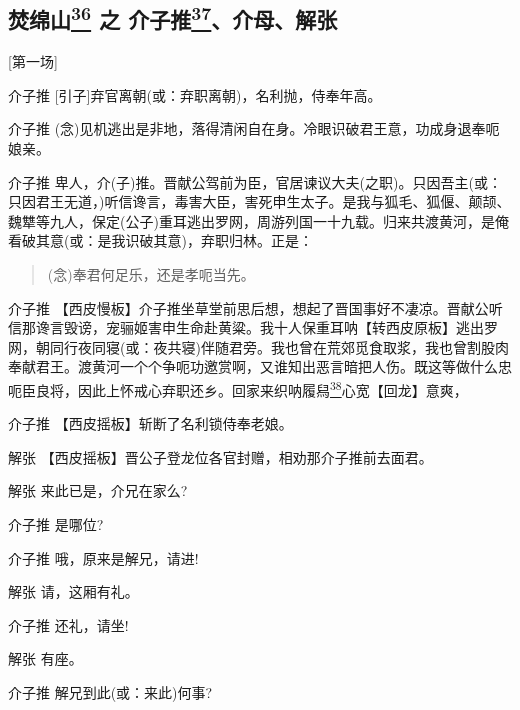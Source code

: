 \setcounter{page}{1}

%
%
%
%
%
\newpage
\hypertarget{ux711aux7ef5ux5c71-ux4e4b-ux4ecbux5b50ux63a8ux4ecbux6bcdux89e3ux5f20}{%
\subsection{\texorpdfstring{焚绵山\protect\hyperlink{fn36}{\textsuperscript{36}}
之
介子推\protect\hyperlink{fn37}{\textsuperscript{37}}、介母、解张}{焚绵山36 之 介子推37、介母、解张}}\label{ux711aux7ef5ux5c71-ux4e4b-ux4ecbux5b50ux63a8ux4ecbux6bcdux89e3ux5f20}}

{[}第一场{]}

介子推 {[}引子{]}弃官离朝(或：弃职离朝)，名利抛，侍奉年高。

介子推
(念)见机逃出是非地，落得清闲自在身。冷眼识破君王意，功成身退奉呃娘亲。

介子推
卑人，介(子)推。晋献公驾前为臣，官居谏议大夫(之职)。只因吾主(或：只因君王无道，)听信谗言，毒害大臣，害死申生太子。是我与狐毛、狐偃、颠颉、魏犨等九人，保定(公子)重耳逃出罗网，周游列国一十九载。归来共渡黄河，是俺看破其意(或：是我识破其意)，弃职归林。正是：

\begin{quote}
(念)奉君何足乐，还是孝呃当先。
\end{quote}

介子推
【西皮慢板】介子推坐草堂前思后想，想起了晋国事好不凄凉。晋献公听信那谗言毁谤，宠骊姬害申生命赴黄粱。我十人保重耳呐【转西皮原板】逃出罗网，朝同行夜同寝(或：夜共寝)伴随君旁。我也曾在荒郊觅食取浆，我也曾割股肉奉献君王。渡黄河一个个争呃功邀赏啊，又谁知出恶言暗把人伤。既这等做什么忠呃臣良将，因此上怀戒心弃职还乡。回家来织呐履舄\protect\hyperlink{fn38}{\textsuperscript{38}}心宽【回龙】意爽，

介子推 【西皮摇板】斩断了名利锁侍奉老娘。

解张 【西皮摇板】晋公子登龙位各官封赠，相劝那介子推前去面君。

解张 来此已是，介兄在家么?

介子推 是哪位?

介子推 哦，原来是解兄，请进!

解张 请，这厢有礼。

介子推 还礼，请坐!

解张 有座。

介子推 解兄到此(或：来此)何事?

